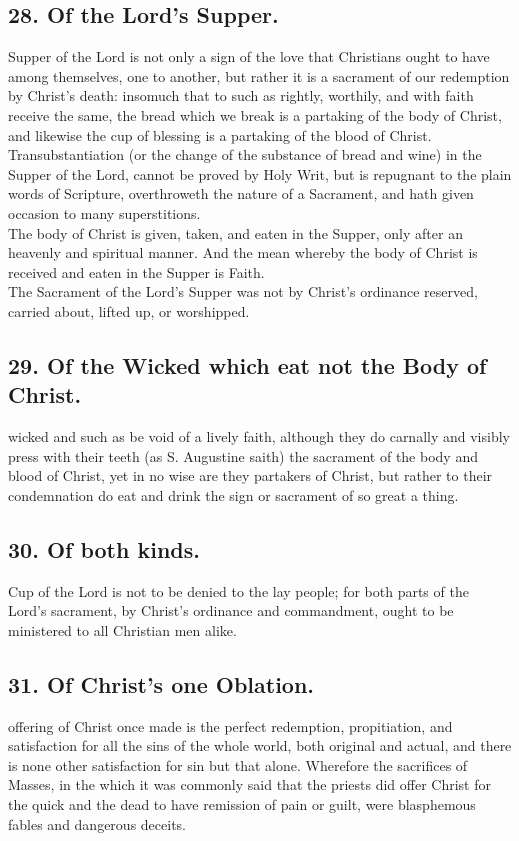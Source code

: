 \subsection{28. Of the Lord's Supper.}
 Supper of the Lord is not only a sign of the love that Christians ought to have among themselves, one to another, but rather it is a sacrament of our redemption by Christ's death: insomuch that to such as rightly, worthily, and with faith receive the same, the bread which we break is a partaking of the body of Christ, and likewise the cup of blessing is a partaking of the blood of Christ.\\
Transubstantiation (or the change of the substance of bread and wine) in the Supper of the Lord, cannot be proved by Holy Writ, but is repugnant to the plain words of Scripture, overthroweth the nature of a Sacrament, and hath given occasion to many superstitions.\\
The body of Christ is given, taken, and eaten in the Supper, only after an heavenly and spiritual manner. And the mean whereby the body of Christ is received and eaten in the Supper is Faith.\\
The Sacrament of the Lord's Supper was not by Christ's ordinance reserved, carried about, lifted up, or worshipped.

\subsection{29. Of the Wicked which eat not the Body of Christ.}
 wicked and such as be void of a lively faith, although they do carnally and visibly press with their teeth (as S. Augustine saith) the sacrament of the body and blood of Christ, yet in no wise are they partakers of Christ, but rather to their condemnation do eat and drink the sign or sacrament of so great a thing.

\subsection{30. Of both kinds.}
 Cup of the Lord is not to be denied to the lay people; for both parts of the Lord's sacrament, by Christ's ordinance and commandment, ought to be ministered to all Christian men alike.

\subsection{31. Of Christ's one Oblation.}
 offering of Christ once made is the perfect redemption, propitiation, and satisfaction for all the sins of the whole world, both original and actual, and there is none other satisfaction for sin but that alone. Wherefore the sacrifices of Masses, in the which it was commonly said that the priests did offer Christ for the quick and the dead to have remission of pain or guilt, were blasphemous fables and dangerous deceits.

